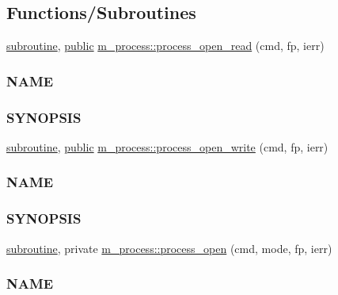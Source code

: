 \subsection*{Functions/\+Subroutines}
\begin{DoxyCompactItemize}
\item 
\hyperlink{M__stopwatch_83_8txt_acfbcff50169d691ff02d4a123ed70482}{subroutine}, \hyperlink{M__stopwatch_83_8txt_a2f74811300c361e53b430611a7d1769f}{public} \hyperlink{namespacem__process_aaaf4d1926258a4cec7da7fc61c38c79d}{m\+\_\+process\+::process\+\_\+open\+\_\+read} (cmd, fp, ierr)
\begin{DoxyCompactList}\small\item\em \subsubsection*{N\+A\+ME}

\subsubsection*{S\+Y\+N\+O\+P\+S\+IS}\end{DoxyCompactList}\item 
\hyperlink{M__stopwatch_83_8txt_acfbcff50169d691ff02d4a123ed70482}{subroutine}, \hyperlink{M__stopwatch_83_8txt_a2f74811300c361e53b430611a7d1769f}{public} \hyperlink{namespacem__process_aa6ed1404ab3472f5068ed15a7a01defc}{m\+\_\+process\+::process\+\_\+open\+\_\+write} (cmd, fp, ierr)
\begin{DoxyCompactList}\small\item\em \subsubsection*{N\+A\+ME}

\subsubsection*{S\+Y\+N\+O\+P\+S\+IS}\end{DoxyCompactList}\item 
\hyperlink{M__stopwatch_83_8txt_acfbcff50169d691ff02d4a123ed70482}{subroutine}, private \hyperlink{namespacem__process_a3c0f543a9ceff2671041d73660f60a59}{m\+\_\+process\+::process\+\_\+open} (cmd, mode, fp, ierr)
\begin{DoxyCompactList}\small\item\em \subsubsection*{N\+A\+ME}


\end{DoxyCompactList}
\end{DoxyCompactItemize}
